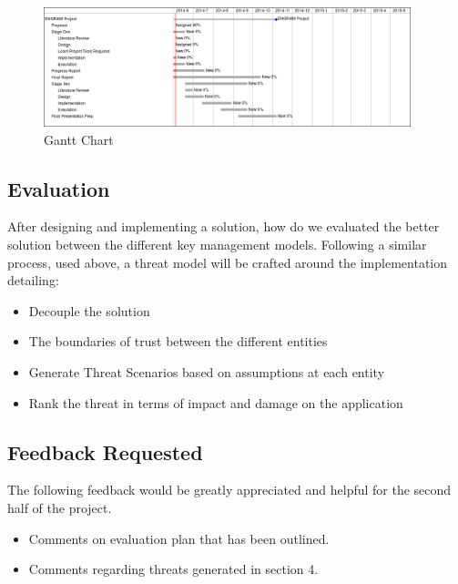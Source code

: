 \documentclass[11pt, a4paper, notitlepage]{article}
\begin{document}
\begin{figure}[h!]
    \centering
    \includegraphics[width=0.95\textwidth]{gannt.png}
    \caption{Gantt Chart}
    \label{gantt}
\end{figure}

\subsection*{Evaluation}
After designing and implementing a solution, how do we evaluated the better solution between the different key management models. Following a similar process, used above, a threat model will be crafted around the implementation detailing:
\begin{itemize}
\item Decouple the solution
\item The boundaries of trust between the different entities
\item Generate Threat Scenarios based on assumptions at each entity
\item Rank the threat in terms of impact and damage on the application
\end{itemize}

\subsection*{Feedback Requested}
The following feedback would be greatly appreciated and helpful for the second half of the project.

\begin{itemize}
\item Comments on evaluation plan that has been outlined.
\item Comments regarding threats generated in section 4.
\end{itemize}



\backmatter



\end{document}
